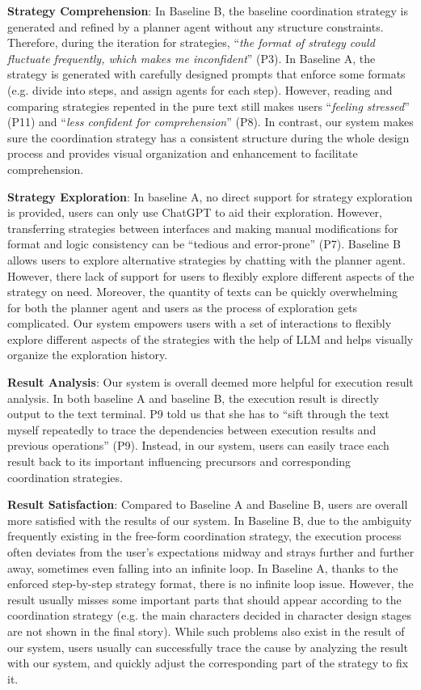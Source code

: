 \textbf{Strategy Comprehension}: In Baseline B, the baseline coordination strategy is generated and refined by a planner agent without any structure constraints. Therefore, during the iteration for strategies, ``\textit{the format of strategy could fluctuate frequently, which makes me inconfident}'' (P3). In Baseline A, the strategy is generated with carefully designed prompts that enforce some formats (e.g. divide into steps, and assign agents for each step). However, reading and comparing strategies repented in the pure text still makes users ``\textit{feeling stressed}'' (P11) and ``\textit{less confident for comprehension}'' (P8). In contrast, our system makes sure the coordination strategy has a consistent structure during the whole design process and provides visual organization and enhancement to facilitate comprehension.

\textbf{Strategy Exploration}: In baseline A, no direct support for strategy exploration is provided, users can only use ChatGPT to aid their exploration. However, transferring strategies between interfaces and making manual modifications for format and logic consistency can be ``tedious and error-prone'' (P7). Baseline B allows users to explore alternative strategies by chatting with the planner agent. However, there lack of support for users to flexibly explore different aspects of the strategy on need. Moreover, the quantity of texts can be quickly overwhelming for both the planner agent and users as the process of exploration gets complicated. Our system empowers users with a set of interactions to flexibly explore different aspects of the strategies with the help of LLM and helps visually organize the exploration history.   

\textbf{Result Analysis}: Our system is overall deemed more helpful for execution result analysis. In both baseline A and baseline B, the execution result is directly output to the text terminal. P9 told us that she has to ``sift through the text myself repeatedly to trace the dependencies between execution results and previous operations'' (P9). Instead, in our system, users can easily trace each result back to its important influencing precursors and corresponding coordination strategies.

\textbf{Result Satisfaction}: Compared to Baseline A and Baseline B, users are overall more satisfied with the results of our system. In Baseline B, due to the ambiguity frequently existing in the free-form coordination strategy, the execution process often deviates from the user’s expectations midway and strays further and further away, sometimes even falling into an infinite loop. In Baseline A, thanks to the enforced step-by-step strategy format, there is no infinite loop issue. However, the result usually misses some important parts that should appear according to the coordination strategy (e.g. the main characters decided in character design stages are not shown in the final story). While such problems also exist in the result of our system, users usually can successfully trace the cause by analyzing the result with our system, and quickly adjust the corresponding part of the strategy to fix it.  



 








